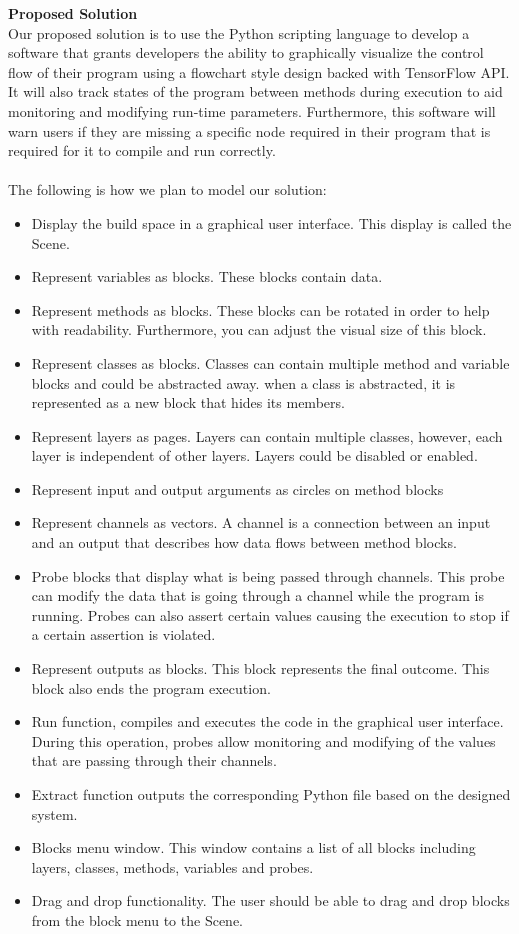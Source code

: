 \documentclass[a4paper,10pt]{IEEEtran} \usepackage[margin=1.0in]{geometry} \usepackage{pdfpages} \usepackage{graphicx}
\begin{document}
	\noindent \textbf{Proposed Solution}\\
	\indent Our proposed solution is to use the Python scripting language to develop a software that grants developers the ability to graphically visualize the control flow of their program using a flowchart style design backed with TensorFlow API.
	 It will also track states of the program between methods during execution to aid monitoring and modifying run-time parameters.
	 Furthermore, this software will warn users if they are missing a specific node required in their program that is required for it to compile and run correctly.\\
	 \\The following is how we plan to model our solution:
	\begin{itemize}
		\item Display the build space in a graphical user interface. This display is called the Scene.
		\item Represent variables as blocks. These blocks contain data.
		\item Represent methods as blocks. These blocks can be rotated in order to help with readability. Furthermore, you can adjust the visual size of this block.
		\item Represent classes as blocks. Classes can contain multiple method and variable blocks and could be abstracted away.
		 when a class is abstracted, it is represented as a new block that hides its members.
		\item Represent layers as pages. Layers can contain multiple classes, however, each layer is independent of other layers. Layers could be disabled or enabled.
		\item Represent input and output arguments as circles on method blocks
		\item Represent channels as vectors. A channel is a connection between an input and an output that describes how data flows between method blocks.
		\item Probe blocks that display what is being passed through channels.
		 This probe can modify the data that is going through a channel while the program is running.
		 Probes can also assert certain values causing the execution to stop if a certain assertion is violated.
		\item Represent outputs as blocks. This block represents the final outcome.
		 This block also ends the program execution.
		\item Run function, compiles and executes the code in the graphical user interface.
		 During this operation, probes allow monitoring and modifying of the values that are passing through their channels.
		\item Extract function outputs the corresponding Python file based on the designed system.
		\item Blocks menu window. This window contains a list of all blocks including layers, classes, methods, variables and probes.
		\item Drag and drop functionality. The user should be able to drag and drop blocks from the block menu to the Scene.
	\end{itemize}
\end{document}
